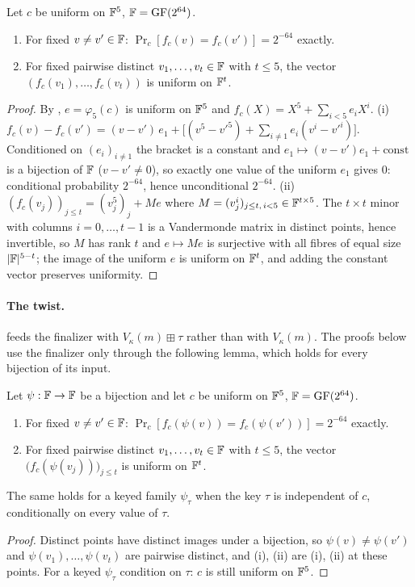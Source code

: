 \begin{lemma}[Finalizer]\label{lem:ph:finalizer}
Let $c$ be uniform on $\mathbb{F}^5$, $\mathbb{F}=\mathrm{GF}(2^{64})$.
\begin{enumerate}[label=(\roman*)]
\item For fixed $v\ne v'\in\mathbb{F}$: $\Pr_c[f_c(v)=f_c(v')]=2^{-64}$ exactly.
\item For fixed pairwise distinct $v_1,\dots,v_t\in\mathbb{F}$ with $t\le5$, the vector
      $(f_c(v_1),\dots,f_c(v_t))$ is uniform on $\mathbb{F}^t$.
\end{enumerate}
\end{lemma}
\begin{proof}
By , $e=\varphi_5(c)$ is uniform on $\mathbb{F}^5$ and
$f_c(X)=X^5+\sum_{i<5}e_iX^i$.
(i) $f_c(v)-f_c(v')=(v-v')\,e_1+\bigl[(v^5-v'^5)+\sum_{i\ne1}e_i(v^i-v'^i)\bigr]$.
Conditioned on $(e_i)_{i\ne1}$ the bracket is a constant and $e_1\mapsto(v-v')e_1+\text{const}$
is a bijection of $\mathbb{F}$ ($v-v'\ne0$), so exactly one value of the uniform $e_1$
gives $0$: conditional probability $2^{-64}$, hence unconditional $2^{-64}$.
(ii) $(f_c(v_j))_{j\le t}=(v_j^5)_j+Me$ where $M=(v_j^i)_{j\le t,\,i<5}\in\mathbb{F}^{t\times5}$.
The $t\times t$ minor with columns $i=0,\dots,t-1$ is a Vandermonde matrix in
distinct points, hence invertible, so $M$ has rank $t$ and $e\mapsto Me$ is
surjective with all fibres of equal size $|\mathbb{F}|^{5-t}$; the image of the uniform
$e$ is uniform on $\mathbb{F}^t$, and adding the constant vector preserves uniformity.
\end{proof}

\paragraph{The twist.}
 feeds the finalizer with $V_\kappa(m)\boxplus\tau$ rather
than with $V_\kappa(m)$.  The proofs below use the finalizer only through the
following lemma, which holds for every bijection of its input.

\begin{lemma}\label{lem:ph:twist}
Let $\psi:\mathbb{F}\to\mathbb{F}$ be a bijection and let $c$ be uniform on $\mathbb{F}^5$,
$\mathbb{F}=\mathrm{GF}(2^{64})$.
\begin{enumerate}[label=(\roman*)]
\item For fixed $v\ne v'\in\mathbb{F}$: $\Pr_c[f_c(\psi(v))=f_c(\psi(v'))]=2^{-64}$ exactly.
\item For fixed pairwise distinct $v_1,\dots,v_t\in\mathbb{F}$ with $t\le5$, the
      vector $\bigl(f_c(\psi(v_j))\bigr)_{j\le t}$ is uniform on $\mathbb{F}^t$.
\end{enumerate}
The same holds for a keyed family $\psi_\tau$ when the key $\tau$ is
independent of $c$, conditionally on every value of $\tau$.
\end{lemma}
\begin{proof}
Distinct points have distinct images under a bijection, so
$\psi(v)\ne\psi(v')$ and $\psi(v_1),\dots,\psi(v_t)$ are pairwise distinct,
and (i), (ii) are (i), (ii) at these points.  For a
keyed $\psi_\tau$ condition on $\tau$: $c$ is still uniform on $\mathbb{F}^5$.
\end{proof}

